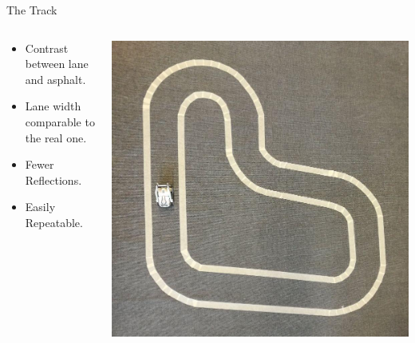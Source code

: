 \documentclass[aspectratio=169,handout]{beamer}
\begin{document}
\begin{frame}{The Track}
	
	\begin{columns}
		\begin{column}{0.5\linewidth}
			\begin{itemize}
				\item<1->{Contrast between lane and asphalt.}
				\item<1->{Lane width comparable to the real one.}
				\item<1->{Fewer Reflections.}
				\item<1->{Easily Repeatable.}
			\end{itemize}
		\end{column}
	\begin{column}{0.5\linewidth}
		\centering
		\includegraphics[width=0.9\linewidth]{img/track.png}
	\end{column}
	\end{columns}
	
\end{frame}
\end{document}
